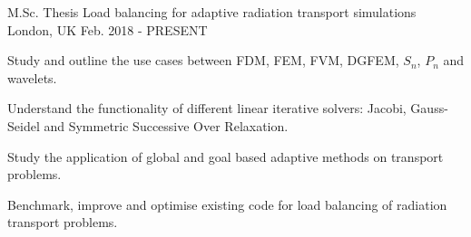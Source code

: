 
\begin{cventries}
	\cventry
		{M.Sc. Thesis}
		{Load balancing for adaptive radiation transport simulations}
		{London, UK}
		{Feb. 2018 - PRESENT}
		{
			\begin{cvitems}
				\item {Study and outline the use cases between FDM, FEM, FVM, DGFEM, $S_n$, $P_n$ and wavelets.}
				\item {Understand the functionality of different linear iterative solvers: Jacobi, Gauss-Seidel and Symmetric Successive Over Relaxation.}
				\item {Study the application of global and goal based adaptive methods on transport problems.}
				\item {Benchmark, improve and optimise existing code for load balancing of radiation transport problems.}
			\end{cvitems}
		}


\end{cventries}
